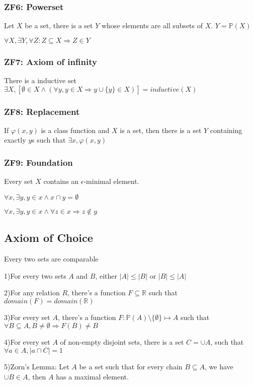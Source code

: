 \documentclass[12pt,a4paper]{ctexrep}
\begin{document}
\subsubsection{ZF6: Powerset}
Let $X$ be a set, there is a set $Y$ whose elements are all subsets of $X$. $Y = \mathbb{P}(X)$

$\forall X, \exists Y, \forall Z : Z \subseteq X \Rightarrow Z \in Y$

\subsubsection{ZF7: Axiom of infinity}
There is a inductive set $\exists X, [\emptyset \in X \wedge (\forall y, y \in X \Rightarrow y \cup \{y\} \in X)] = inductive(X)$

\subsubsection{ZF8: Replacement}
If $\varphi(x,y)$ is a class function and $X$ is a set, then there is a set $Y$ containing exactly $y$s such that $\exists x, \varphi(x,y)$

\subsubsection{ZF9: Foundation}
Every set $X$ contains an $\epsilon$-minimal element.

$\forall x, \exists y, y \in x \wedge x\cap y = \emptyset$

$\forall x, \exists y, y \in x \wedge \forall z \in x \Rightarrow z \notin y$

\subsection{Axiom of Choice}
Every two sets are comparable

1)For every two sets $A$ and $B$, either $|A| \leqslant |B|$ or $|B|\leqslant|A|$

2)For any relation $R$, there's a function $F \subseteq \mathbb{R}$ such that $domain(F) = domain(\mathbb{R})$

3)For every set $A$, there's a function $F: \mathbb{P}(A) \setminus\{\emptyset\} \mapsto A$ such that $\forall B \subseteq A, B \neq \emptyset \Rightarrow F(B) \neq B$

4)For every set $A$ of non-empty disjoint sets, there is a set $C = \cup A$, such that $\forall a \in A, |a\cap C| = 1$

5)Zorn's Lemma: Let $A$ be a set such that for every chain $B \subseteq A$, we have $\cup B \in A$, then $A$ has a maximal element.
\end{document}
